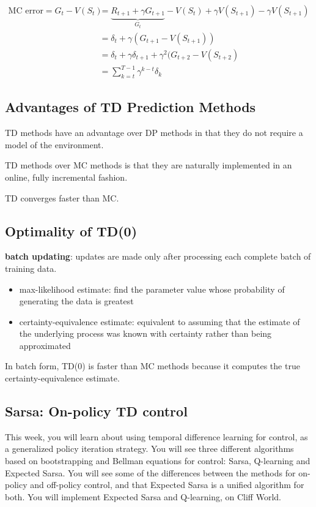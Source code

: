 \documentclass[sutton_barto_notes.tex]{subfiles}
\begin{document}
\begin{align*}
\text{MC error} = G_t - V(S_t) &= \underbrace{R_{t+1}+\gamma G_{t+1}}_{G_t} - V(S_t) + \gamma V(S_{t+1}) - \gamma V(S_{t+1}) \\
&= \delta_t + \gamma (G_{t+1} - V(S_{t+1})) \\
&= \delta_t + \gamma \delta_{t+1} + \gamma^2 (G_{t+2} - V(S_{t+2})\\
&= \sum_{k=t}^{T-1} \gamma^{k-t} \delta_k
\end{align*}

\subsection{Advantages of TD Prediction Methods}

TD methods have an advantage over DP methods in that they do not require a model of the environment.

TD methods over MC methods is that they are naturally implemented in an online, fully incremental fashion.

TD converges faster than MC.

\subsection{Optimality of TD(0)}

\begin{definition}
\textbf{batch updating}: updates are made only after processing each complete batch of training data.
\end{definition}

\begin{itemize}
\item max-likelihood estimate: find the parameter value whose probability of generating the data is greatest
\item certainty-equivalence estimate: equivalent to assuming that the estimate of the underlying process was known with certainty rather than being approximated
\end{itemize}

In batch form, TD(0) is faster than MC methods because it computes the true certainty-equivalence estimate.

\subsection{Sarsa: On-policy TD control}

This week, you will learn about using temporal difference learning for control, as a generalized policy iteration strategy. You will see three different algorithms based on bootstrapping and Bellman equations for control: Sarsa, Q-learning and Expected Sarsa. You will see some of the differences between the methods for on-policy and off-policy control, and that Expected Sarsa is a unified algorithm for both. You will implement Expected Sarsa and Q-learning, on Cliff World.
\end{document}
